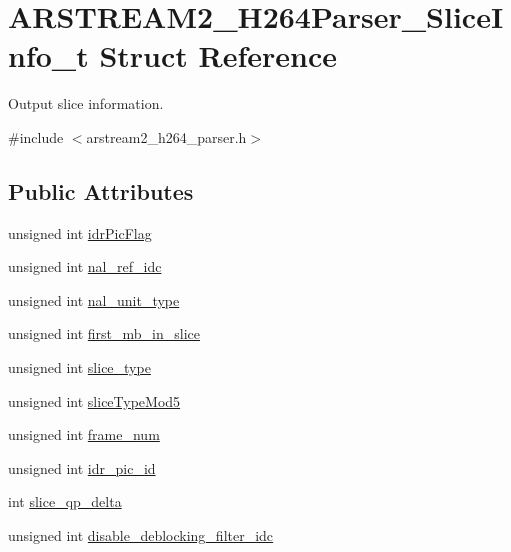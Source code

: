 \hypertarget{struct_a_r_s_t_r_e_a_m2___h264_parser___slice_info__t}{}\section{A\+R\+S\+T\+R\+E\+A\+M2\+\_\+\+H264\+Parser\+\_\+\+Slice\+Info\+\_\+t Struct Reference}
\label{struct_a_r_s_t_r_e_a_m2___h264_parser___slice_info__t}


Output slice information.  




{\ttfamily \#include $<$arstream2\+\_\+h264\+\_\+parser.\+h$>$}

\subsection*{Public Attributes}
\begin{DoxyCompactItemize}
\item 
unsigned int \hyperlink{struct_a_r_s_t_r_e_a_m2___h264_parser___slice_info__t_afb6694c02ad764bf4b02e18d95c139f1}{idr\+Pic\+Flag}
\item 
unsigned int \hyperlink{struct_a_r_s_t_r_e_a_m2___h264_parser___slice_info__t_ab38124007a6341188b3591bfe18b965d}{nal\+\_\+ref\+\_\+idc}
\item 
unsigned int \hyperlink{struct_a_r_s_t_r_e_a_m2___h264_parser___slice_info__t_a7ca657a62119df523994f94d358c72c7}{nal\+\_\+unit\+\_\+type}
\item 
unsigned int \hyperlink{struct_a_r_s_t_r_e_a_m2___h264_parser___slice_info__t_aae829cbde06e939c7d50b17fd8cbecc1}{first\+\_\+mb\+\_\+in\+\_\+slice}
\item 
unsigned int \hyperlink{struct_a_r_s_t_r_e_a_m2___h264_parser___slice_info__t_aa356d4557369811687d754ef99ec4fd2}{slice\+\_\+type}
\item 
unsigned int \hyperlink{struct_a_r_s_t_r_e_a_m2___h264_parser___slice_info__t_af957e9ced225bf8e36d89a718d79fdfe}{slice\+Type\+Mod5}
\item 
unsigned int \hyperlink{struct_a_r_s_t_r_e_a_m2___h264_parser___slice_info__t_aff6d7a9220bcac2df8e41fb0c2a1e24d}{frame\+\_\+num}
\item 
unsigned int \hyperlink{struct_a_r_s_t_r_e_a_m2___h264_parser___slice_info__t_ad21d7f7e9578dba4fd1ceacdcdc9b54c}{idr\+\_\+pic\+\_\+id}
\item 
int \hyperlink{struct_a_r_s_t_r_e_a_m2___h264_parser___slice_info__t_aa326a36ecaf4944e97042e7c4ab60bf6}{slice\+\_\+qp\+\_\+delta}
\item 
unsigned int \hyperlink{struct_a_r_s_t_r_e_a_m2___h264_parser___slice_info__t_aff78e8f6cec78550ea0d1a8eb9f8a75e}{disable\+\_\+deblocking\+\_\+filter\+\_\+idc}
\end{DoxyCompactItemize}


